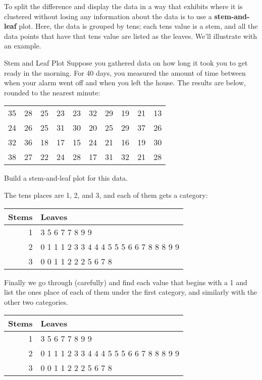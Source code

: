 To split the difference and display the data in a way that exhibits where it is clustered without losing any information about the data is to use a \textbf{stem-and-leaf} plot.  Here, the data is grouped by tens; each tens value is a stem, and all the data points that have that tens value are listed as the leaves.  We'll illustrate with an example.
\pagebreak

\begin{example}{Stem and Leaf Plot}
Suppose you gathered data on how long it took you to get ready in the morning.  For 40 days, you measured the amount of time between when your alarm went off and when you left the house.  The results are below, rounded to the nearest minute:
\begin{center}
\begin{tabular}{c c c c c c c c c c}
35 & 28 & 25 & 23 & 23 & 32 & 29 & 19 & 21 & 13\\
24 & 26 & 25 & 31 & 30 & 20 & 25 & 29 & 37 & 26\\
32 & 36 & 18 & 17 & 15 & 24 & 21 & 16 & 19 & 30\\
38 & 27 & 22 & 24 & 28 & 17 & 31 & 32 & 21 & 28\\
\end{tabular}
\end{center}
Build a stem-and-leaf plot for this data.

\sol
The tens places are 1, 2, and 3, and each of them gets a category:
\begin{center}
\begin{tabular}{r | l}
Stems & Leaves\\
\hline
1 & {\color{white}3 5 6 7 7 8 9 9}\\
2 & {\color{white}0 1 1 1 2 3 3 4 4 4 5 5 5 6 6 7 8 8 8 9 9}\\
3 & {\color{white}0 0 1 1 2 2 2 5 6 7 8}
\end{tabular}
\end{center}

Finally we go through (carefully) and find each value that begins with a 1 and list the ones place of each of them under the first category, and similarly with the other two categories.
\begin{center}
\begin{tabular}{r | l}
Stems & Leaves\\
\hline
1 & 3 5 6 7 7 8 9 9\\
2 & 0 1 1 1 2 3 3 4 4 4 5 5 5 6 6 7 8 8 8 9 9\\
3 & 0 0 1 1 2 2 2 5 6 7 8
\end{tabular}
\end{center}
\end{example}

